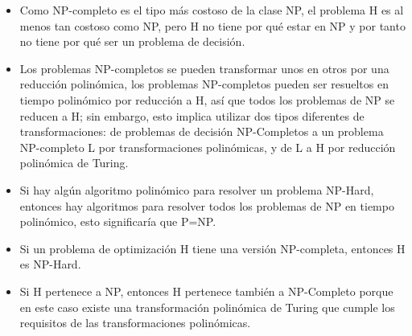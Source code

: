 \documentclass[12pt]{report}
\begin{document}
\begin{itemize}
\item Como NP-completo es el tipo más costoso de la clase NP, el problema H es al menos tan costoso como NP, pero H no tiene por qué estar en NP y por tanto no tiene por qué ser un problema de decisión.
\item Los problemas NP-completos se pueden transformar unos en otros por una reducción polinómica, los problemas NP-completos pueden ser resueltos en tiempo polinómico por reducción a H, así que todos los problemas de NP se reducen a H; sin embargo, esto implica utilizar dos tipos diferentes de transformaciones: de problemas de decisión NP-Completos a un problema NP-completo L por transformaciones polinómicas, y de L a H por reducción polinómica de Turing.
\item Si hay algún algoritmo polinómico para resolver un problema NP-Hard, entonces hay algoritmos para resolver todos los problemas de NP en tiempo polinómico, esto significaría que P=NP.
\item Si un problema de optimización H tiene una versión NP-completa, entonces H es NP-Hard.
\item Si H pertenece a NP, entonces H pertenece también a NP-Completo porque en este caso existe una transformación polinómica de Turing que cumple los requisitos de las transformaciones polinómicas.
\end{itemize}
\end{document}
